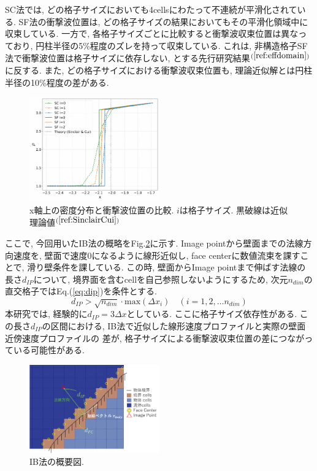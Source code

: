 \documentclass[a4j]{jarticle}
\begin{document}
SC法では, どの格子サイズにおいても4cellsにわたって不連続が平滑化されている.
SF法の衝撃波位置は, どの格子サイズの結果においてもその平滑化領域中に収束している.
一方で, 各格子サイズごとに比較すると衝撃波収束位置は異なっており,
円柱半径の5\%程度のズレを持って収束している.
これは, 非構造格子SF法で衝撃波位置は格子サイズに依存しない, とする先行研究結果$^{(\ref{ref:effdomain})}$に反する.
また, どの格子サイズにおける衝撃波収束位置も, 理論近似解とは円柱半径の10\%程度の差がある.
\begin{figure}[h]
    \begin{center}
        \includegraphics[width=0.5\textwidth]{2Dcircle_shockposi_comp.pdf}
    \end{center}
    \caption{x軸上の密度分布と衝撃波位置の比較. $i$は格子サイズ. 黒破線は近似理論値$^{(\ref{ref:SinclairCui})}$}
    \label{fig:2Dcircle_shockposi}
\end{figure}
ここで, 今回用いたIB法の概略をFig.\ref{fig:IBsitu}に示す. Image pointから壁面までの法線方向速度を, 壁面で速度0になるように線形近似し,
face centerに数値流束を課すことで, 滑り壁条件を課している.
この時, 壁面からImage pointまで伸ばす法線の長さ$d_{IP}$について, 
境界面を含むcellを自己参照しないようにするため, 
次元$n_{dim}$の直交格子ではEq.(\ref{eq:dip})を条件とする.
\begin{equation}
    d_{IP} > \sqrt{n_{dim}} \cdot \text{max} (\Delta x_{i}) \quad (i = 1, 2, \dots n_{dim})
    \label{eq:dip}
\end{equation}
本研究では, 経験的に$d_{IP} = 3 \Delta x$としている.
ここに格子サイズ依存性がある. 
この長さ$d_{IP}$の区間における, 
IB法で近似した線形速度プロファイルと実際の壁面近傍速度プロファイルの
差が, 格子サイズによる衝撃波収束位置の差につながっている可能性がある.
\begin{figure}[h]
    \begin{center}
        \includegraphics[width=0.5\textwidth]{IBsitu.pdf}
    \end{center}
    \caption{IB法の概要図.}
    \label{fig:IBsitu}
\end{figure}
\end{document}
